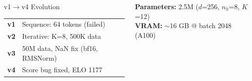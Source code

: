 \documentclass{beamer}
\begin{document}
\begin{frame}
\begin{columns}
\vspace{0.2em}
\begin{block}{v1$\to$v4 Evolution}
\scriptsize
\begin{tabular}{ll}
\textbf{v1} & Sequence: 64 tokens (failed) \\
\textbf{v2} & Iterative: K=8, 500K data \\
\textbf{v3} & 50M data, NaN fix (bf16, RMSNorm) \\
\textbf{v4} & \alert{Score bug fixed}, ELO 1177 \\
\end{tabular}
\end{block}

\vspace{0.3em}
\textbf{Parameters:} 2.5M ($d$=256, $n_h$=8, $K$=12)\\
\textbf{VRAM:} $\sim$16 GB @ batch 2048 (A100)

\end{columns}

\end{frame}
\end{document}
